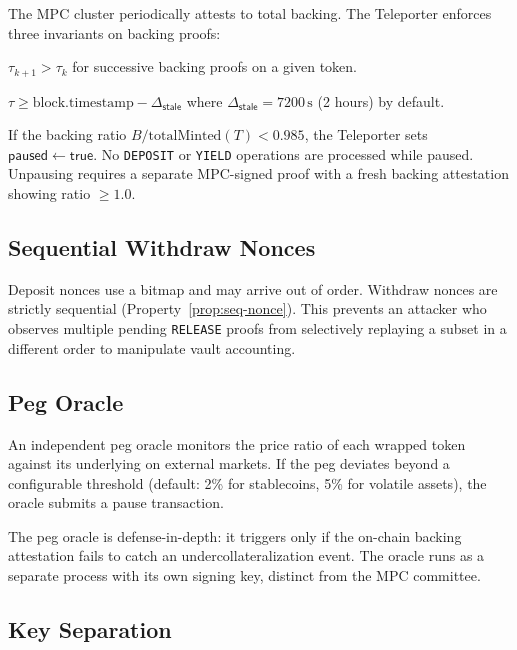 The MPC cluster periodically attests to total backing. The Teleporter enforces three invariants on backing proofs:

\begin{invariant}
$\tau_{k+1} > \tau_k$ for successive backing proofs on a given token.
\end{invariant}

\begin{invariant}
$\tau \geq \mathrm{block.timestamp} - \Delta_{\mathsf{stale}}$ where $\Delta_{\mathsf{stale}} = 7200\,\text{s}$ (2 hours) by default.
\end{invariant}

\begin{invariant}
If the backing ratio $B / \mathrm{totalMinted}(T) < 0.985$, the Teleporter sets $\mathsf{paused} \leftarrow \mathsf{true}$. No \texttt{DEPOSIT} or \texttt{YIELD} operations are processed while paused. Unpausing requires a separate MPC-signed proof with a fresh backing attestation showing ratio $\geq 1.0$.
\end{invariant}

\subsection{Sequential Withdraw Nonces}

Deposit nonces use a bitmap and may arrive out of order. Withdraw nonces are strictly sequential (Property~\ref{prop:seq-nonce}). This prevents an attacker who observes multiple pending \texttt{RELEASE} proofs from selectively replaying a subset in a different order to manipulate vault accounting.

\subsection{Peg Oracle}

An independent peg oracle monitors the price ratio of each wrapped token against its underlying on external markets. If the peg deviates beyond a configurable threshold (default: 2\% for stablecoins, 5\% for volatile assets), the oracle submits a pause transaction.

The peg oracle is defense-in-depth: it triggers only if the on-chain backing attestation fails to catch an undercollateralization event. The oracle runs as a separate process with its own signing key, distinct from the MPC committee.

\subsection{Key Separation}

